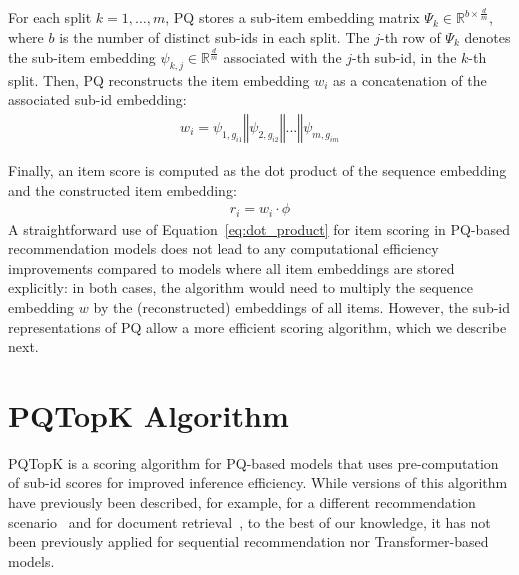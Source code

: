 \documentclass[sigconf,natbib=true, review=False]{acmart} %
\newcommand{\pageenlarge}[1]{\marginnote{#1}\enlargethispage{#1\baselineskip}}
\newcommand{\rsasha}[1]{\textcolor[HTML]{000000}{#1}}
\begin{document}
For each split $k=1,\ldots,m$, PQ stores a sub-item embedding matrix $\Psi_k \in \mathbb{R}^{b\times\frac{d}{m}}$, where $b$ is the number of distinct sub-ids in each split. The $j$-th row of $\Psi_k$ denotes the sub-item embedding $\psi_{k,j} \in \mathbb{R}^{\frac{d}{m}}$ associated with the $j$-th sub-id, in the $k$-th split.
Then, PQ reconstructs the item embedding $w_i$ as a concatenation of the associated sub-id embedding: 
\begin{align}
    w_i =  \psi_{1,g_{i1}} \mathbin\Vert \psi_{2,g_{i2}}  \mathbin\Vert ... \mathbin\Vert  \psi_{m,g_{im}} \label{eq:pq:item_embedding}
\end{align}

Finally, an item score is computed as the dot product of the sequence embedding and the constructed item embedding: 
\begin{align}
    r_i = w_i \cdot \phi\label{eq:dot_product}
\end{align}
 A straightforward use of Equation~\eqref{eq:dot_product} for item scoring in PQ-based recommendation models does not lead to any computational efficiency improvements compared to models where all item embeddings are stored explicitly: \rsasha{in both cases, the algorithm would need to multiply the sequence embedding $w$  by the (reconstructed) embeddings of all items.}
However, \rsasha{the sub-id representations of} PQ \rsasha{allow} a more efficient scoring algorithm, \rsasha{which we describe next}. 


\vspace{-0.5\baselineskip}
\section{PQTopK Algorithm} \label{sec:pq_topk}
\rsasha{PQTopK is a scoring algorithm for PQ-based models \rsasha{that uses pre-computation of sub-id scores for improved inference efficiency}. While versions of this algorithm have previously been described, for example, for a different recommendation scenario~\cite{lianLightRecMemorySearchEfficient2020} and for document retrieval~\cite{zhanJointlyOptimizingQuery2021}, to the best of our knowledge, it has not been previously applied for sequential recommendation nor Trans\-former-based models.}
\end{document}
